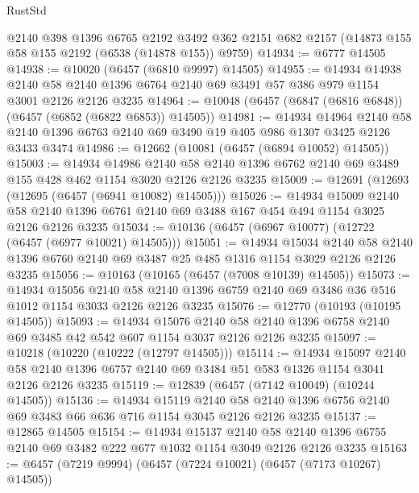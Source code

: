 \begin{lexlean}{RustStd}
\begin{coremodule}
    @2140
    @398
    @1396
    @6765
    @2192
    @3492
    @362
    @2151
    @682
    @2157
    (@14873 @155 @58 @155 @2192 (@6538 (@14878 @155)) @9759)
@14934 := @6777 @14505
@14938 := @10020 (@6457 (@6810 @9997) @14505)
@14955 := @14934
    @14938
    @2140
    @58
    @2140
    @1396
    @6764
    @2140
    @69
    @3491
    @57
    @386
    @979
    @1154
    @3001
    @2126
    @2126
    @3235
@14964 := @10048 (@6457 (@6847 (@6816 @6848)) (@6457 (@6852 (@6822 @6853)) @14505))
@14981 := @14934
    @14964
    @2140
    @58
    @2140
    @1396
    @6763
    @2140
    @69
    @3490
    @19
    @405
    @986
    @1307
    @3425
    @2126
    @3433
    @3474
@14986 := @12662 (@10081 (@6457 (@6894 @10052) @14505))
@15003 := @14934
    @14986
    @2140
    @58
    @2140
    @1396
    @6762
    @2140
    @69
    @3489
    @155
    @428
    @462
    @1154
    @3020
    @2126
    @2126
    @3235
@15009 := @12691 (@12693 (@12695 (@6457 (@6941 @10082) @14505)))
@15026 := @14934
    @15009
    @2140
    @58
    @2140
    @1396
    @6761
    @2140
    @69
    @3488
    @167
    @454
    @494
    @1154
    @3025
    @2126
    @2126
    @3235
@15034 := @10136 (@6457 (@6967 @10077) (@12722 (@6457 (@6977 @10021) @14505)))
@15051 := @14934
    @15034
    @2140
    @58
    @2140
    @1396
    @6760
    @2140
    @69
    @3487
    @25
    @485
    @1316
    @1154
    @3029
    @2126
    @2126
    @3235
@15056 := @10163 (@10165 (@6457 (@7008 @10139) @14505))
@15073 := @14934
    @15056
    @2140
    @58
    @2140
    @1396
    @6759
    @2140
    @69
    @3486
    @36
    @516
    @1012
    @1154
    @3033
    @2126
    @2126
    @3235
@15076 := @12770 (@10193 (@10195 @14505))
@15093 := @14934
    @15076
    @2140
    @58
    @2140
    @1396
    @6758
    @2140
    @69
    @3485
    @42
    @542
    @607
    @1154
    @3037
    @2126
    @2126
    @3235
@15097 := @10218 (@10220 (@10222 (@12797 @14505)))
@15114 := @14934
    @15097
    @2140
    @58
    @2140
    @1396
    @6757
    @2140
    @69
    @3484
    @51
    @583
    @1326
    @1154
    @3041
    @2126
    @2126
    @3235
@15119 := @12839 (@6457 (@7142 @10049) (@10244 @14505))
@15136 := @14934
    @15119
    @2140
    @58
    @2140
    @1396
    @6756
    @2140
    @69
    @3483
    @66
    @636
    @716
    @1154
    @3045
    @2126
    @2126
    @3235
@15137 := @12865 @14505
@15154 := @14934
    @15137
    @2140
    @58
    @2140
    @1396
    @6755
    @2140
    @69
    @3482
    @222
    @677
    @1032
    @1154
    @3049
    @2126
    @2126
    @3235
@15163 := @6457 (@7219 @9994) (@6457 (@7224 @10021) (@6457 (@7173 @10267) @14505))

\end{coremodule}
\end{lexlean}
